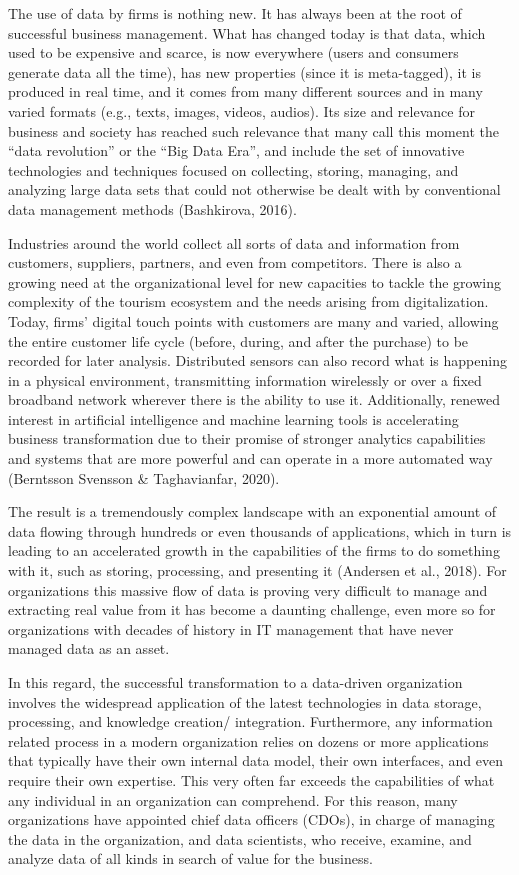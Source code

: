\documentclass[
  letterpaper,
  DIV=11,
  numbers=noendperiod]{scrreprt}
\begin{document}
The use of data by firms is nothing new. It has always been at the root
of successful business management. What has changed today is that data,
which used to be expensive and scarce, is now everywhere (users and
consumers generate data all the time), has new properties (since it is
meta-tagged), it is produced in real time, and it comes from many
different sources and in many varied formats (e.g., texts, images,
videos, audios). Its size and relevance for business and society has
reached such relevance that many call this moment the ``data
revolution'' or the ``Big Data Era'', and include the set of innovative
technologies and techniques focused on collecting, storing, managing,
and analyzing large data sets that could not otherwise be dealt with by
conventional data management methods (Bashkirova, 2016).

Industries around the world collect all sorts of data and information
from customers, suppliers, partners, and even from competitors. There is
also a growing need at the organizational level for new capacities to
tackle the growing complexity of the tourism ecosystem and the needs
arising from digitalization. Today, firms' digital touch points with
customers are many and varied, allowing the entire customer life cycle
(before, during, and after the purchase) to be recorded for later
analysis. Distributed sensors can also record what is happening in a
physical environment, transmitting information wirelessly or over a
fixed broadband network wherever there is the ability to use it.
Additionally, renewed interest in artificial intelligence and machine
learning tools is accelerating business transformation due to their
promise of stronger analytics capabilities and systems that are more
powerful and can operate in a more automated way (Berntsson Svensson \&
Taghavianfar, 2020).

The result is a tremendously complex landscape with an exponential
amount of data flowing through hundreds or even thousands of
applications, which in turn is leading to an accelerated growth in the
capabilities of the firms to do something with it, such as storing,
processing, and presenting it (Andersen et al., 2018). For organizations
this massive flow of data is proving very difficult to manage and
extracting real value from it has become a daunting challenge, even more
so for organizations with decades of history in IT management that have
never managed data as an asset.

In this regard, the successful transformation to a data-driven
organization involves the widespread application of the latest
technologies in data storage, processing, and knowledge creation/
integration. Furthermore, any information related process in a modern
organization relies on dozens or more applications that typically have
their own internal data model, their own interfaces, and even require
their own expertise. This very often far exceeds the capabilities of
what any individual in an organization can comprehend. For this reason,
many organizations have appointed chief data officers (CDOs), in charge
of managing the data in the organization, and data scientists, who
receive, examine, and analyze data of all kinds in search of value for
the business.
\end{document}
